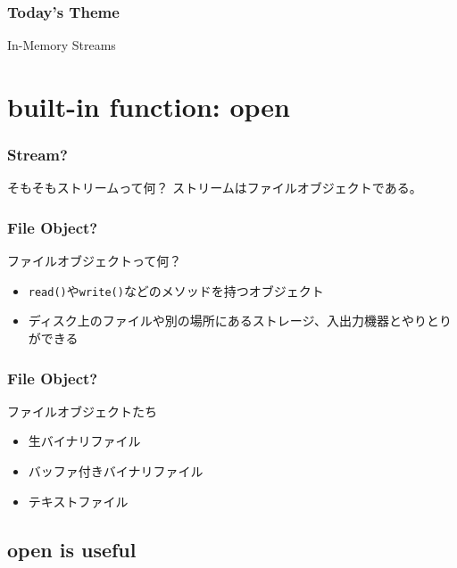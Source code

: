 \documentclass[aspectratio=169,dvipdfmx,14pt,notheorems]{beamer}
\theoremstyle{definition}
\begin{document}
\begin{frame}\frametitle{Today's Theme}
\begin{center}
\huge{In-Memory Streams}
\end{center}
\end{frame}

\section{built-in function: open}

\begin{frame}\frametitle{Stream?}

\begin{block}{そもそもストリームって何？}
ストリームはファイルオブジェクトである。
\end{block}

\end{frame}

\begin{frame}\frametitle{File Object?}

\begin{block}{ファイルオブジェクトって何？}
\begin{itemize}
\item \texttt{read()}や\texttt{write()}などのメソッドを持つオブジェクト
\item ディスク上のファイルや別の場所にあるストレージ、入出力機器とやりとりができる
\end{itemize}
\end{block}

\end{frame}

\begin{frame}\frametitle{File Object?}

\begin{block}{ファイルオブジェクトたち}
\begin{itemize}
\item 生バイナリファイル
\item バッファ付きバイナリファイル
\item テキストファイル
\end{itemize}
\end{block}

\end{frame}

\subsection{open is useful}
\end{document}
